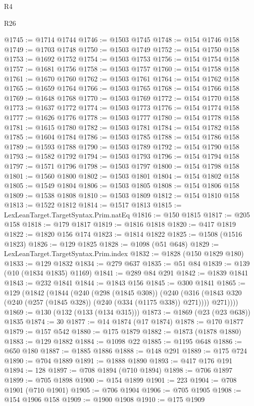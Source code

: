 \begin{lexlean}{R4}
\begin{lexlean}{R26}
\begin{coremodule}
{{{{{{{{{{{{{{{{{{{{{{{{{{{{{{{{{{{{{{{{{{{{{{{{{{{{{{{{{{{{{{{{{{{{{{{{@1745 := @1714 @1744
@1746 := @1503 @1745
@1748 := @154 @1746 @158
@1749 := @1703 @1748
@1750 := @1503 @1749
@1752 := @154 @1750 @158
@1753 := @1692 @1752
@1754 := @1503 @1753
@1756 := @154 @1754 @158
@1757 := @1681 @1756
@1758 := @1503 @1757
@1760 := @154 @1758 @158
@1761 := @1670 @1760
@1762 := @1503 @1761
@1764 := @154 @1762 @158
@1765 := @1659 @1764
@1766 := @1503 @1765
@1768 := @154 @1766 @158
@1769 := @1648 @1768
@1770 := @1503 @1769
@1772 := @154 @1770 @158
@1773 := @1637 @1772
@1774 := @1503 @1773
@1776 := @154 @1774 @158
@1777 := @1626 @1776
@1778 := @1503 @1777
@1780 := @154 @1778 @158
@1781 := @1615 @1780
@1782 := @1503 @1781
@1784 := @154 @1782 @158
@1785 := @1604 @1784
@1786 := @1503 @1785
@1788 := @154 @1786 @158
@1789 := @1593 @1788
@1790 := @1503 @1789
@1792 := @154 @1790 @158
@1793 := @1582 @1792
@1794 := @1503 @1793
@1796 := @154 @1794 @158
@1797 := @1571 @1796
@1798 := @1503 @1797
@1800 := @154 @1798 @158
@1801 := @1560 @1800
@1802 := @1503 @1801
@1804 := @154 @1802 @158
@1805 := @1549 @1804
@1806 := @1503 @1805
@1808 := @154 @1806 @158
@1809 := @1538 @1808
@1810 := @1503 @1809
@1812 := @154 @1810 @158
@1813 := @1522 @1812
@1814 := @1517 @1813
@1815 := LexLeanTarget.TargetSyntax.Prim.natEq
@1816 := @150 @1815
@1817 := @205 @158
@1818 := @179 @1817
@1819 := @1816 @1818
@1820 := @417 @1819
@1822 := @1820 @156 @174
@1823 := @1814 @1822
@1825 := @1508 (@1516 @1823)
@1826 := @129 @1825
@1828 := @1098 (@51 @648)
@1829 := LexLeanTarget.TargetSyntax.Prim.index
@1832 := @1828 (@150 @1829 @180)
@1833 := @129 @1832
@1834 := @279 @637
@1835 := @51 @84
@1839 := @139 (@10 (@1834 @1835) @1169)
@1841 := @289 @84 @291
@1842 := @1839 @1841
@1843 := @232 @1841
@1844 := @1843 @156
@1845 := @300 @1841
@1865 := @129
    (@1842
      (@1844
        (@240
          (@298 (@1845 @308))
          (@240
            (@316 (@1843 @320 (@240 (@257 (@1845 @328)) (@240 (@334 (@1175 @338)) @271))))
            @271))))
@1869 := @130 (@132 (@133 (@134 @315)))
@1873 := @1869 (@23 (@23 @638)) @1835
@1874 := 30
@1877 := @14 @1874 (@17 @1874)
@1878 := @170 @1877
@1879 := @157 @542
@1880 := @175 @1879
@1882 := @1873 (@1878 @1880)
@1883 := @129 @1882
@1884 := @1098 @22
@1885 := @1195 @648
@1886 := @650 @180
@1887 := @1885 @1886
@1888 := @148 @291
@1889 := @175 @724
@1890 := @704 @1889
@1891 := @1888 @1890
@1893 := @417 @176 @191
@1894 := 128
@1897 := @708 @1894 (@710 @1894)
@1898 := @706 @1897
@1899 := @705 @1898
@1900 := @154 @1899
@1901 := 223
@1904 := @708 @1901 (@710 @1901)
@1905 := @706 @1904
@1906 := @705 @1905
@1908 := @154 @1906 @158
@1909 := @1900 @1908
@1910 := @175 @1909
}}}}}}}}}}}}}}}}}}}}}}}}}}}}}}}}}}}}}}}}}}}}}}}}}}}}}}}}}}}}}}}}}}}}}}}}
\end{coremodule}
\end{lexlean}
\end{lexlean}
